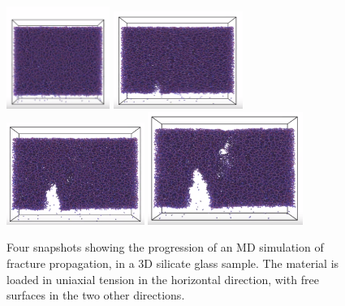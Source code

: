 \begin{figure}
    \centering
    \noindent
\hspace{6pt}\includegraphics[width=0.3\textwidth,height=0.35\textwidth]{images/frac_prop1.PNG}\hspace{0.23\textwidth}%
\includegraphics[width=0.375\textwidth,height=0.325\textwidth]{images/frac_prop2.PNG}\\[2em]
\includegraphics[width=0.4\textwidth,height=0.325\textwidth]{images/frac_prop3.PNG}\hspace{0.15\textwidth}%
\includegraphics[width=0.45\textwidth,height=0.324\textwidth]{images/frac_prop4.PNG}\par
    \caption{Four snapshots showing the progression of an MD simulation of fracture propagation, in a 3D silicate glass sample. The material is loaded in uniaxial tension in the horizontal direction, with free surfaces in the two other directions.}
    \label{fig:crack_prop}
\end{figure}

